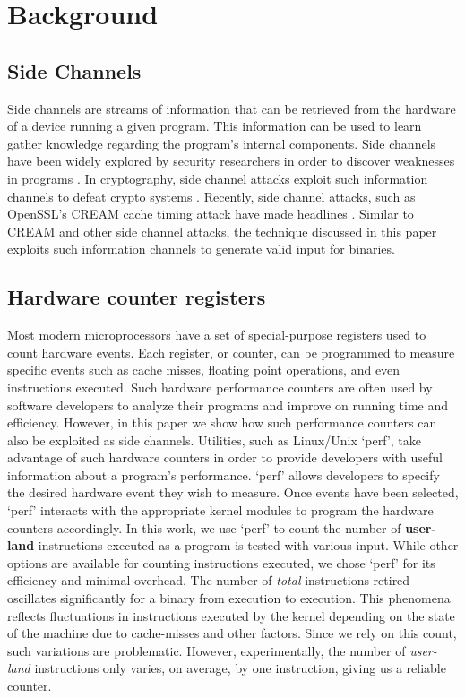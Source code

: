 \documentclass{acm_proc_article-sp}
\begin{document}
\section{Background} \label{background}
\subsection{Side Channels} \label{bg_sidechannels}
Side channels are streams of information that can be retrieved from the hardware of a device running a given program.
This information can be used to learn gather knowledge regarding the program's internal components.
Side channels have been widely explored by security researchers in order to discover weaknesses in programs \cite{weinbergside, schindler2002combined, genkin2014rsa, genkinstealing}.
In cryptography, side channel attacks exploit such information channels to defeat crypto systems \cite{zhou2005side, black2002black, okeya2006side}.
Recently, side channel attacks, such as OpenSSL's CREAM cache timing attack have made headlines \cite{creamssl}.
Similar to CREAM and other side channel attacks, the technique discussed in this paper exploits such information channels to generate valid input for binaries.
\subsection{Hardware counter registers} \label{bg_hardwarereg}
Most modern microprocessors have a set of special-purpose registers used to count hardware events.
Each register, or counter, can be programmed to measure specific events such as cache misses, floating point operations, and even instructions executed.
Such hardware performance counters are often used by software developers to analyze their programs and improve on running time and efficiency.
However, in this paper we show how such performance counters can also be exploited as side channels.
Utilities, such as Linux/Unix `perf', take advantage of such hardware counters in order to provide developers with useful information about a program's performance.
`perf' allows developers to specify the desired hardware event they wish to measure.
Once events have been selected, `perf' interacts with the appropriate kernel modules to program the hardware counters accordingly.
In this work, we use `perf' to count the number of \textbf{user-land} instructions executed as a program is tested with various input.
While other options are available for counting instructions executed, we chose `perf' for its efficiency and minimal overhead.
The number of \textit{total} instructions retired oscillates significantly for a binary from execution to execution.
This phenomena reflects fluctuations in instructions executed by the kernel depending on the state of the machine due to cache-misses and other factors.
Since we rely on this count, such variations are problematic.
However, experimentally, the number of \textit{user-land} instructions only varies, on average, by one instruction, giving us a reliable counter.
\end{document}
